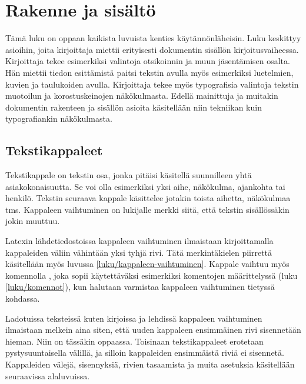 
\chapter{Rakenne ja sisältö}
\label{luku/rakenne}

Tämä luku on oppaan kaikista luvuista kenties käytännönläheisin. Luku
keskittyy asioihin, joita kirjoittaja miettii erityisesti dokumentin
sisällön kirjoitusvaiheessa. Kirjoittaja tekee esimerkiksi valintoja
otsikoinnin ja muun jäsentämisen osalta. Hän miettii tiedon esittämistä
paitsi tekstin avulla myös esimerkiksi luetelmien, kuvien ja taulukoiden
avulla. Kirjoittaja tekee myös typografisia valintoja tekstin muotoilun
ja korostuskeinojen näkökulmasta. Edellä mainittuja ja muitakin
dokumentin rakenteen ja sisällön asioita käsitellään niin tekniikan kuin
typografiankin näkökulmasta.

\section{Tekstikappaleet}
\label{luku/kappale}

Tekstikappale on tekstin osa, jonka pitäisi käsitellä suunnilleen yhtä
asiakokonaisuutta. Se voi olla esimerkiksi yksi aihe, näkökulma,
ajankohta tai henkilö. Tekstin seuraava kappale käsittelee jotakin
toista aihetta, näkökulmaa tms. Kappaleen vaihtuminen on lukijalle
merkki siitä, että tekstin sisällössäkin jokin muuttuu.

Latexin lähdetiedostoissa kappaleen vaihtuminen ilmaistaan
kirjoittamalla kappaleiden väliin vähintään yksi tyhjä rivi. Tätä
merkintäkielen piirrettä käsitellään myös luvussa
\ref{luku/kappaleen-vaihtuminen}. Kappale vaihtuu myös komennolla
, joka sopii käytettäväksi esimerkiksi komentojen
määrittelyssä (luku \ref{luku/komennot}), kun halutaan varmistaa
kappaleen vaihtuminen tietyssä kohdassa.

Ladotuissa teksteissä kuten kirjoissa ja lehdissä kappaleen vaihtuminen
ilmaistaan melkein aina siten, että uuden kappaleen ensimmäinen rivi
sisennetään hieman. Niin on tässäkin oppaassa. Toisinaan tekstikappaleet
erotetaan pystysuuntaisella välillä, ja silloin kappaleiden ensimmäistä
riviä ei sisennetä. Kappaleiden välejä, sisennyksiä, rivien tasaamista
ja muita asetuksia käsitellään seuraavissa alaluvuissa.

